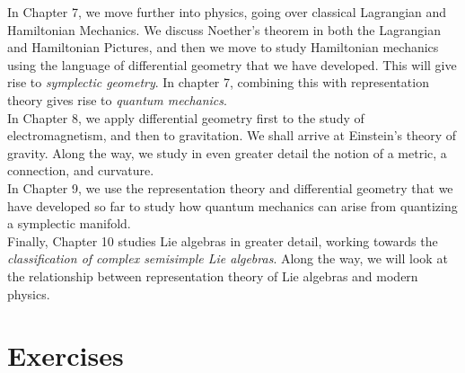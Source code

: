 \documentclass[../master.tex]{subfiles}
\begin{document}
	In Chapter 7, we move further into physics, going over classical Lagrangian and Hamiltonian Mechanics. We discuss Noether's theorem in both the Lagrangian and Hamiltonian Pictures, and then we move to study Hamiltonian mechanics using the language of differential geometry that we have developed. This will give rise to \emph{symplectic geometry}. In chapter 7, combining this with representation theory gives rise to \emph{quantum mechanics}.\\
	
	In Chapter 8, we apply differential geometry first to the study of electromagnetism, and then to gravitation. We shall arrive at Einstein's theory of gravity. Along the way, we study in even greater detail the notion of a metric, a connection, and curvature. \\
	
	In Chapter 9, we use the representation theory and differential geometry that we have developed so far to study how quantum mechanics can arise from quantizing a symplectic manifold.\\
	
	Finally, Chapter 10 studies Lie algebras in greater detail, working towards the \emph{classification of complex semisimple Lie algebras}. Along the way, we will look at the relationship between representation theory of Lie algebras and modern physics. 
	
	
	
	\section{Exercises} %
	\label{sec:exercises2}
	
	
	
\end{document}
